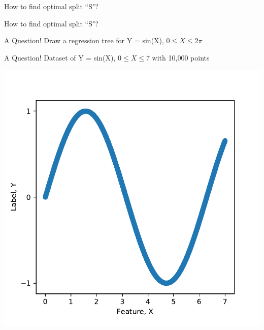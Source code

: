 \documentclass{beamer}
\begin{document}
\begin{frame}{How to find optimal split ``S"?}
\end{frame}


\begin{frame}{How to find optimal split ``S"?}
\begin{enumerate}
\end{enumerate} 
\end{frame}

\begin{frame}{A Question!}
Draw a regression tree for Y = sin(X), $0 \leq X \leq 2\pi$ 
\end{frame}

\begin{frame}{A Question!}
Dataset of Y = sin(X), $0 \leq X \leq 7$ with 10,000 points 
\begin{center}
\includegraphics[scale=0.5]{decision-trees-regression/imgs/sine-dataset}
\end{center}
\end{frame}
\end{document}
